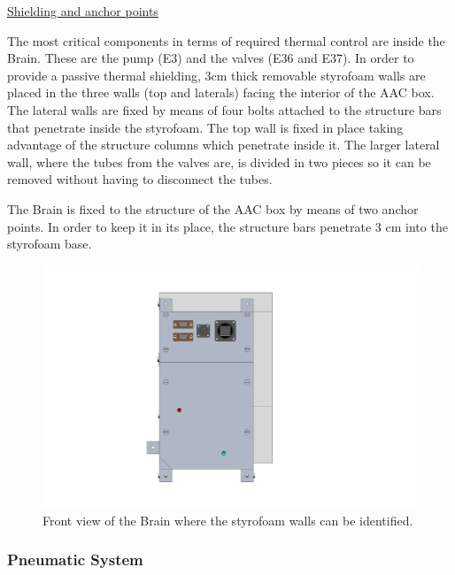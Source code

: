 




\pagebreak
\underline{Shielding and anchor points}

The most critical components in terms of required thermal control are inside the Brain. These are the pump (E3) and the valves (E36 and E37). In order to provide a passive thermal shielding, 3cm thick removable styrofoam walls are placed in the three walls (top and laterals) facing the interior of the AAC box. 
The lateral walls are fixed by means of four bolts attached to the structure bars that penetrate inside the styrofoam. The top wall is fixed in place taking advantage of the structure columns which penetrate inside it.
The larger lateral wall, where the tubes from the valves are, is divided in two pieces so it can be removed without having to disconnect the tubes. 

\smallskip
The Brain is fixed to the structure of the AAC box by means of two anchor points. In order to keep it in its place, the structure bars penetrate 3 cm into the styrofoam base.

\begin{figure}[H]
    \centering
    \includegraphics[width=1\textwidth]{4-experiment-design/img/Mechanical/Panel_Front.png}
    \caption{Front view of the Brain where the styrofoam walls can be identified.}
    \label{brain_front}
\end{figure}


\pagebreak
\subsubsection{Pneumatic System}
\label{sec:4.4.5}

